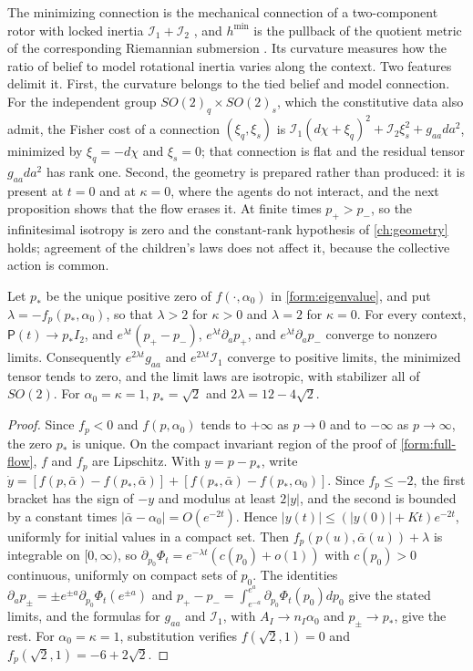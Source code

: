 The minimizing connection is the mechanical connection of a two-component rotor with locked inertia $\mathcal I_1+\mathcal I_2$ \citep{Smale1970}, and $h^{\min}$ is the pullback of the quotient metric of the corresponding Riemannian submersion \citep{ONeill1966}. Its curvature measures how the ratio of belief to model rotational inertia varies along the context. Two features delimit it. First, the curvature belongs to the tied belief and model connection. For the independent group $SO(2)_q\times SO(2)_s$, which the constitutive data also admit, the Fisher cost of a connection $(\xi_q,\xi_s)$ is $\mathcal I_1(d\chi+\xi_q)^2+\mathcal I_2\xi_s^2+g_{aa}da^2$, minimized by $\xi_q=-d\chi$ and $\xi_s=0$; that connection is flat and the residual tensor $g_{aa}da^2$ has rank one. Second, the geometry is prepared rather than produced: it is present at $t=0$ and at $\kappa=0$, where the agents do not interact, and the next proposition shows that the flow erases it. At finite times $p_+>p_-$, so the infinitesimal isotropy is zero and the constant-rank hypothesis of \cref{ch:geometry} holds; agreement of the children's laws does not affect it, because the collective action is common.

Let $p_*$ be the unique positive zero of $f(\cdot,\alpha_0)$ in \cref{form:eigenvalue}, and put $\lambda=-f_p(p_*,\alpha_0)$, so that $\lambda>2$ for $\kappa>0$ and $\lambda=2$ for $\kappa=0$. For every context, $\mathsf P(t)\to p_*I_2$, and $e^{\lambda t}(p_+-p_-)$, $e^{\lambda t}\partial_ap_+$, and $e^{\lambda t}\partial_ap_-$ converge to nonzero limits. Consequently $e^{2\lambda t}g_{aa}$ and $e^{2\lambda t}\mathcal I_1$ converge to positive limits, the minimized tensor tends to zero, and the limit laws are isotropic, with stabilizer all of $SO(2)$. For $\alpha_0=\kappa=1$, $p_*=\sqrt2$ and $2\lambda=12-4\sqrt2$.

\begin{proof}
Since $f_p<0$ and $f(p,\alpha_0)$ tends to $+\infty$ as $p\to0$ and to $-\infty$ as $p\to\infty$, the zero $p_*$ is unique. On the compact invariant region of the proof of \cref{form:full-flow}, $f$ and $f_p$ are Lipschitz. With $y=p-p_*$, write $\dot y=[f(p,\bar\alpha)-f(p_*,\bar\alpha)]+[f(p_*,\bar\alpha)-f(p_*,\alpha_0)]$. Since $f_p\le-2$, the first bracket has the sign of $-y$ and modulus at least $2|y|$, and the second is bounded by a constant times $|\bar\alpha-\alpha_0|=O(e^{-2t})$. Hence $|y(t)|\le(|y(0)|+Kt)e^{-2t}$, uniformly for initial values in a compact set. Then $f_p(p(u),\bar\alpha(u))+\lambda$ is integrable on $[0,\infty)$, so $\partial_{p_0}\Phi_t=e^{-\lambda t}(c(p_0)+o(1))$ with $c(p_0)>0$ continuous, uniformly on compact sets of $p_0$. The identities $\partial_ap_\pm=\pm e^{\pm a}\partial_{p_0}\Phi_t(e^{\pm a})$ and $p_+-p_-=\int_{e^{-a}}^{e^a}\partial_{p_0}\Phi_t(p_0)dp_0$ give the stated limits, and the formulas for $g_{aa}$ and $\mathcal I_1$, with $A_I\to n_I\alpha_0$ and $p_\pm\to p_*$, give the rest. For $\alpha_0=\kappa=1$, substitution verifies $f(\sqrt2,1)=0$ and $f_p(\sqrt2,1)=-6+2\sqrt2$.
\end{proof}

